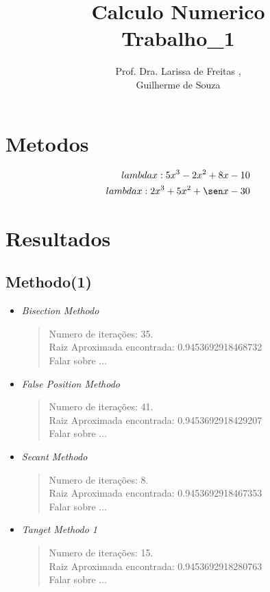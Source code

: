 \documentclass[12pt]{article}
\title{Calculo Numerico\\Trabalho\_1}
\author{Prof. Dra. Larissa de Freitas \inst{1},\\Guilherme de Souza\inst{1}}
\begin{document}
 

\maketitle

\section{Metodos}
\begin{eqnarray}
lambda  x: 5x^{3} - 2x^{2} + 8x - 10\\
lambda  x: 2x^{3} + 5x^{2} + \sen x - 30\\

\end{eqnarray}

\section{Resultados}
\subsection{Methodo(1)}
\begin{itemize}
    \item \textit{Bisection Methodo}\\
        \begin{verse}
          Numero de iterações: 35.\\
          Raiz Aproximada encontrada: 0.9453692918468732\\
          Falar sobre ...
        \end{verse}
    \item \textit{False Position Methodo}
        \begin{verse}
          Numero de iterações: 41.\\
          Raiz Aproximada encontrada: 0.9453692918429207\\
          Falar sobre ...
        \end{verse}
    \item \textit{Secant Methodo}
        \begin{verse}
          Numero de iterações: 8.\\
          Raiz Aproximada encontrada: 0.9453692918467353\\
          Falar sobre ...
        \end{verse}
    \item \textit{Tanget Methodo 1}
        \begin{verse}
          Numero de iterações: 15.\\
          Raiz Aproximada encontrada: 0.9453692918280763\\
          Falar sobre ...
        \end{verse}
\end{itemize}
\end{document}
